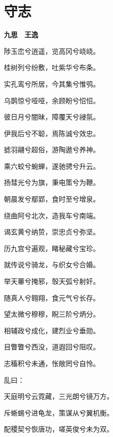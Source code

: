 \documentclass[12pt,a4paper]{ctexbook}
\begin{document}
\section{守志}
\textbf{九思　王逸}\par\vspace{0.5em}
陟玉峦兮逍遥，览高冈兮峣峣。\par
桂树列兮纷敷，吐紫华兮布条。\par
实孔鸾兮所居，今其集兮惟鸮。\par
乌鹊惊兮哑哑，余顾盼兮怊怊。\par
彼日月兮闇昧，障覆天兮祲氛。\par
伊我后兮不聪，焉陈诚兮效忠。\par
摅羽翮兮超俗，游陶遨兮养神。\par
乘六蛟兮蜿蝉，遂驰骋兮升云。\par
扬彗光兮为旗，秉电策兮为鞭。\par
朝晨发兮鄢郢，食时至兮增泉。\par
绕曲阿兮北次，造我车兮南端。\par
谒玄黄兮纳贽，崇忠贞兮弥坚。\par
历九宫兮遍观，睹秘藏兮宝珍。\par
就传说兮骑龙，与织女兮合婚。\par
举天罼兮掩邪，彀天弧兮射奸。\par
随真人兮翱翔，食元气兮长存。\par
望太微兮穆穆，睨三阶兮炳分。\par
相辅政兮成化，建烈业兮垂勋。\par
目瞥瞥兮西没，道遐回兮阻叹。\par
志稸积兮未通，怅敞罔兮自怜。\par
乱曰：\par
天庭明兮云霓藏，三光朗兮镜万方。\par
斥蜥蜴兮进龟龙，策谋从兮翼机衡。\par
配稷契兮恢唐功，嗟英俊兮未为双。\par
\end{document}
